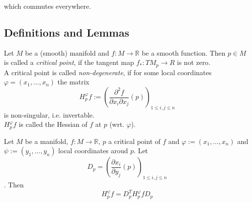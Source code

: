 \documentclass[a4paper,11pt]{article}
\begin{document}
which commutes everywhere.

\subsection{Definitions and Lemmas}

\begin{definition}
   \label{def:critical point}

   Let $M$ be a (smooth) manifold and $f: M \rightarrow \mathbb{R}$ be a smooth function.
   Then $p \in M$ is called a \textit{critical point}, if the tangent map 
   $f_*: TM_p \rightarrow R$ is not zero. \\
   A critical point is called \textit{non-degenerate}, if for some local coordinates $\varphi = (x_1, ..., x_n)$
   the matrix 
   \[ H_p^{\varphi}f := \left(\frac{\partial^2 f}{\partial x_i \partial x_j}(p)\right)_{1 \leq i,j \leq n} \]
   is non-singular, i.e. invertable. \\
   $H_p^{\varphi}f$ is called the Hessian of $f$ at $p$ (wrt. $\varphi$).

\end{definition}

\begin{lemma}
   \label{lemma:congruency}   

   Let $M$ be a manifold, $f: M \rightarrow \mathbb{R}$, $p$ a critical point of $f$
   and $\varphi := (x_1, ..., x_n)$ and $\psi := (y_1, ..., y_n)$ local coordinates
   aroud $p$. Let 
   \[ D_p = \left( \frac{\partial x_i}{\partial y_j}(p) \right)_{1 \leq i, j \leq n}\].
   Then 
   \[ H_p^{\psi}f = D_p^T H_p^{\varphi}f D_p \]

\end{lemma}
\end{document}
